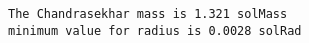 \documentclass[11pt]{article}
\begin{document}
    \begin{Verbatim}[commandchars=\\\{\}]
The Chandrasekhar mass is 1.321 solMass
minimum value for radius is 0.0028 solRad
\end{Verbatim}


    
    
    
    
\end{document}
